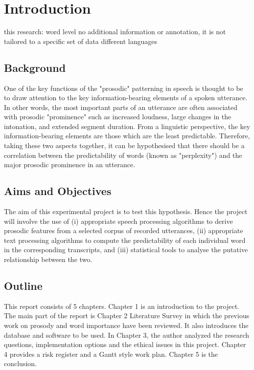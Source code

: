 \chapter{Introduction}

this research:
word level
no additional information or annotation, 
it is not tailored to a specific set of data 
different languages

\section{Background}
 One of the key functions of the "prosodic" patterning in speech is thought to be to draw attention to the key information-bearing elements of a spoken utterance. In other words, the most important parts of an utterance are often associated with prosodic "prominence" such as increased loudness, large changes in the intonation, and extended segment duration. From a linguistic perspective, the key information-bearing elements are those which are the least predictable. Therefore, taking these two aspects together, it can be hypothesised that there should be a correlation between the predictability of words (known as "perplexity") and the major prosodic prominence in an utterance.

\section{Aims and Objectives}

The aim of this experimental project is to test this hypothesis. Hence the project will involve the use of (i) appropriate speech processing algorithms to derive prosodic features from a selected corpus of recorded utterances, (ii) appropriate text processing algorithms to compute the predictability of each individual word in the corresponding transcripts, and (iii) statistical tools to analyse the putative relationship between the two.



\section{Outline}
This report consists of 5 chapters. Chapter 1 is an introduction to the project. The main part of the report is Chapter 2 Literature Survey in which the previous work on prosody and word importance have been reviewed. It also introduces the database and software to be used. In Chapter 3, the author analyzed the research questions, implementation options and the ethical issues in this project. Chapter 4 provides a risk register and a Gantt style work plan. Chapter 5 is the conclusion.    

